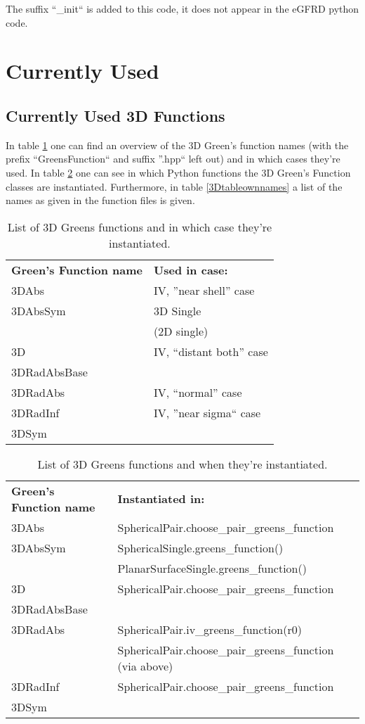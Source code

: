 \documentclass[a4paper,10pt]{article}
\begin{document}
The suffix ``\_init`` is added to this code, it does not appear in the eGFRD python code.


\section{Currently Used}

\subsection{Currently Used 3D Functions}

In table \ref{3Dtable} one can find an overview of the 3D Green's function names (with the prefix ``GreensFunction`` and suffix ''.hpp`` left out) and in which cases they're used. In table \ref{3Dtableinst} one can see in which Python functions the 3D Green's Function classes are instantiated. Furthermore, in table \ref{3Dtableownnames} a list of the names as given in the function files is given.

\begin{table}[h!]
\caption{List of 3D Greens functions and in which case they're instantiated.}
\label{3Dtable}
\begin{tabular}{ p{} p{} }
  \textbf{Green's Function name} & \textbf{Used in case:} \\
3DAbs 		& IV, ''near shell'' case\\
3DAbsSym 	& 3D Single  \\
		& (2D single) \\
3D 		& IV, ``distant both'' case\\
3DRadAbsBase 	& \\
3DRadAbs	& IV, ``normal'' case\\
3DRadInf 	& IV, ''near sigma`` case\\
3DSym 		& \\
\end{tabular}
\end{table}

\begin{table}[h!]
\caption{List of 3D Greens functions and when they're instantiated.}
\label{3Dtableinst}
\begin{tabular}{ p{} p{} }
  \textbf{Green's Function name} & \textbf{Instantiated in:} \\
3DAbs 		& SphericalPair.choose\_pair\_greens\_function\\
3DAbsSym 	& SphericalSingle.greens\_function()\\
		& PlanarSurfaceSingle.greens\_function()\\
3D 		& SphericalPair.choose\_pair\_greens\_function\\
3DRadAbsBase 	& \\
3DRadAbs	& SphericalPair.iv\_greens\_function(r0)\\
		& SphericalPair.choose\_pair\_greens\_function (via above)\\
3DRadInf 	& SphericalPair.choose\_pair\_greens\_function\\
3DSym 		& \\
\end{tabular}
\end{table}
\end{document}
